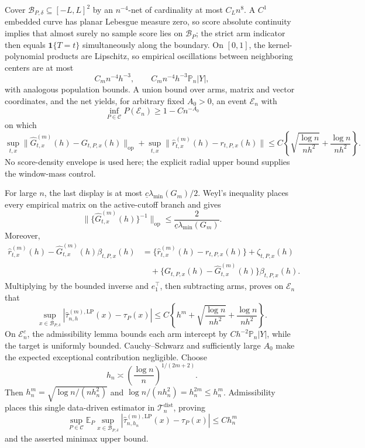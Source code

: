Cover \(\mathcal B_{P,\delta}\subseteq[-L,L]^2\) by an \(n^{-4}\)-net of cardinality at most \(C_Ln^8\).  A \(C^1\) embedded curve has planar Lebesgue measure zero, so score absolute continuity implies that almost surely no sample score lies on \(\mathcal B_P\); the strict arm indicator then equals \(\mathbf1\{T=t\}\) simultaneously along the boundary.  On \([0,1]\), the kernel-polynomial products are Lipschitz, so empirical oscillations between neighboring centers are at most
\[
 C_mn^{-4}h^{-3},
 \qquad C_mn^{-4}h^{-3}\mathbb P_n|Y|,
\]
with analogous population bounds.  A union bound over arms, matrix and vector coordinates, and the net yields, for arbitrary fixed \(A_0>0\), an event \(\mathcal E_n\) with
\[
 \inf_{P\in\mathcal C}P(\mathcal E_n)\geq1-Cn^{-A_0}
\]
on which
\[
 \sup_{t,x}\|\widehat G^{(m)}_{t,x}(h)-G_{t,P,x}(h)\|_{\mathrm{op}}
 +\sup_{t,x}\|\widehat r^{(m)}_{t,x}(h)-r_{t,P,x}(h)\|
 \leq C\left\{\sqrt{\frac{\log n}{nh^2}}+\frac{\log n}{nh^2}\right\}.
\]
No score-density envelope is used here; the explicit radial upper bound supplies the window-mass control.

For large \(n\), the last display is at most \(\underline c\lambda_{\min}(G_m)/2\).  Weyl's inequality places every empirical matrix on the active-cutoff branch and gives
\[
 \|\{\widehat G^{(m)}_{t,x}(h)\}^{-1}\|_{\mathrm{op}}
 \leq\frac{2}{\underline c\lambda_{\min}(G_m)}.
\]
Moreover,
\[
\begin{aligned}
 \widehat r^{(m)}_{t,x}(h)-\widehat G^{(m)}_{t,x}(h)\beta_{t,P,x}(h)
 &=\{\widehat r^{(m)}_{t,x}(h)-r_{t,P,x}(h)\}+\zeta_{t,P,x}(h)\\
 &\quad+\{G_{t,P,x}(h)-\widehat G^{(m)}_{t,x}(h)\}\beta_{t,P,x}(h).
\end{aligned}
\]
Multiplying by the bounded inverse and \(e_1^\top\), then subtracting arms, proves on \(\mathcal E_n\) that
\[
 \sup_{x\in\mathcal B_{P,\delta}}
 |\widehat\tau^{(m),\mathrm{LP}}_{n,h}(x)-\tau_P(x)|
 \leq C\left\{h^m+\sqrt{\frac{\log n}{nh^2}}+
 \frac{\log n}{nh^2}\right\}.
\]
On \(\mathcal E_n^c\), the admissibility lemma bounds each arm intercept by \(Ch^{-2}\mathbb P_n|Y|\), while the target is uniformly bounded.  Cauchy--Schwarz and sufficiently large \(A_0\) make the expected exceptional contribution negligible.  Choose
\[
 h_n\asymp\left(\frac{\log n}{n}\right)^{1/(2m+2)}.
\]
Then \(h_n^m=\sqrt{\log n/(nh_n^2)}\) and \(\log n/(nh_n^2)=h_n^{2m}\leq h_n^m\).  Admissibility places this single data-driven estimator in \(\mathcal T_n^{\mathrm{dist}}\), proving
\[
 \sup_{P\in\mathcal C}\mathbb E_P\sup_{x\in\mathcal B_{P,\delta}}
 |\widehat\tau^{(m),\mathrm{LP}}_{n,h_n}(x)-\tau_P(x)|
 \leq Ch_n^m
\]
and the asserted minimax upper bound.

